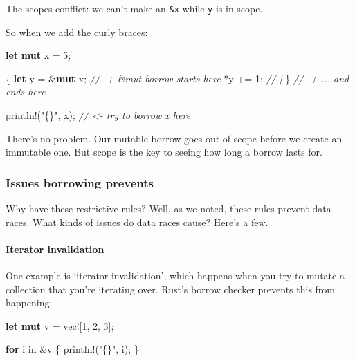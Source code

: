 \documentclass[a4paper,]{book}
\newenvironment{Shaded}{\begin{snugshade}}{\end{snugshade}}
\newcommand{\KeywordTok}[1]{\textcolor[rgb]{0.13,0.29,0.53}{\textbf{{#1}}}}
\newcommand{\DecValTok}[1]{\textcolor[rgb]{0.00,0.00,0.81}{{#1}}}
\newcommand{\StringTok}[1]{\textcolor[rgb]{0.31,0.60,0.02}{{#1}}}
\newcommand{\CommentTok}[1]{\textcolor[rgb]{0.56,0.35,0.01}{\textit{{#1}}}}
\newcommand{\OtherTok}[1]{\textcolor[rgb]{0.56,0.35,0.01}{{#1}}}
\newcommand{\NormalTok}[1]{{#1}}
\begin{document}
The scopes conflict: we can't make an \texttt{\&x} while \texttt{y} is
in scope.

So when we add the curly braces:

\begin{Shaded}
\begin{Highlighting}[]
\KeywordTok{let} \KeywordTok{mut} \NormalTok{x = }\DecValTok{5}\NormalTok{;}

\NormalTok{\{                   }
    \KeywordTok{let} \NormalTok{y = &}\KeywordTok{mut} \NormalTok{x; }\CommentTok{// -+ &mut borrow starts here}
    \NormalTok{*y += }\DecValTok{1}\NormalTok{;        }\CommentTok{//  |}
\NormalTok{\}                   }\CommentTok{// -+ ... and ends here}

\OtherTok{println!}\NormalTok{(}\StringTok{"\{\}"}\NormalTok{, x);  }\CommentTok{// <- try to borrow x here}
\end{Highlighting}
\end{Shaded}

There's no problem. Our mutable borrow goes out of scope before we
create an immutable one. But scope is the key to seeing how long a
borrow lasts for.

\subsubsection{Issues borrowing
prevents}\label{issues-borrowing-prevents}

Why have these restrictive rules? Well, as we noted, these rules prevent
data races. What kinds of issues do data races cause? Here's a few.

\paragraph{Iterator invalidation}\label{iterator-invalidation}

One example is `iterator invalidation', which happens when you try to
mutate a collection that you're iterating over. Rust's borrow checker
prevents this from happening:

\begin{Shaded}
\begin{Highlighting}[]
\KeywordTok{let} \KeywordTok{mut} \NormalTok{v = }\OtherTok{vec!}\NormalTok{[}\DecValTok{1}\NormalTok{, }\DecValTok{2}\NormalTok{, }\DecValTok{3}\NormalTok{];}

\KeywordTok{for} \NormalTok{i in &v \{}
    \OtherTok{println!}\NormalTok{(}\StringTok{"\{\}"}\NormalTok{, i);}
\NormalTok{\}}
\end{Highlighting}
\end{Shaded}
\end{document}
